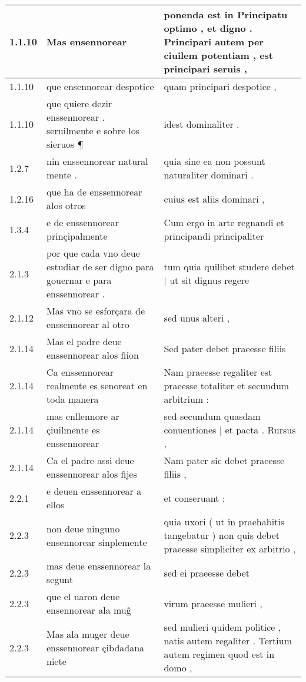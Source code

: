 \begin{tabular}{|p{1cm}|p{6.5cm}|p{6.5cm}|}

\hline
1.1.10 & Mas ensennorear & ponenda est in Principatu optimo , et digno . Principari autem per ciuilem potentiam , est principari seruis , \\\hline
1.1.10 & que ensennorear despotice & quam principari despotice , \\\hline
1.1.10 & que quiere dezir enssennorear . seruilmente e sobre los sieruos ¶ & idest dominaliter . \\\hline
1.2.7 & nin enssennorear natural mente . & quia sine ea non possunt naturaliter dominari . \\\hline
1.2.16 & que ha de enssennorear alos otros & cuius est aliis dominari , \\\hline
1.3.4 & e de enssennorear prinçipalmente & Cum ergo in arte regnandi et principandi principaliter \\\hline
2.1.3 & por que cada vno deue estudiar de ser digno para gouernar e para enssennorear . & tum quia quilibet studere debet | ut sit dignus regere \\\hline
2.1.12 & Mas vno se esforçara de enssennorear al otro & sed unus alteri , \\\hline
2.1.14 & Mas el padre deue enssennorear alos fiion & Sed pater debet praeesse filiis \\\hline
2.1.14 & Ca enssennorear realmente es senoreat en toda manera & Nam praeesse regaliter est praeesse totaliter et secundum arbitrium : \\\hline
2.1.14 & mas enllennore ar çiuilmente es enssennorear & sed secundum quasdam conuentiones | et pacta . Rursus , \\\hline
2.1.14 & Ca el padre assi deue enssennorear alos fijes & Nam pater sic debet praeesse filiis , \\\hline
2.2.1 & e deuen enssennorear a ellos & et conseruant : \\\hline
2.2.3 & non deue ninguno ensennorear sinplemente & quia uxori ( ut in praehabitis tangebatur ) non quis debet praeesse simpliciter ex arbitrio , \\\hline
2.2.3 & mas deue enssennorear la segunt & sed ei praeesse debet \\\hline
2.2.3 & que el uaron deue ensennorear ala mug̃ & virum praeesse mulieri , \\\hline
2.2.3 & Mas ala muger deue enssennorear çibdadana niete & sed mulieri quidem politice , natis autem regaliter . Tertium autem regimen quod est in domo , \\\hline

\end{tabular}

